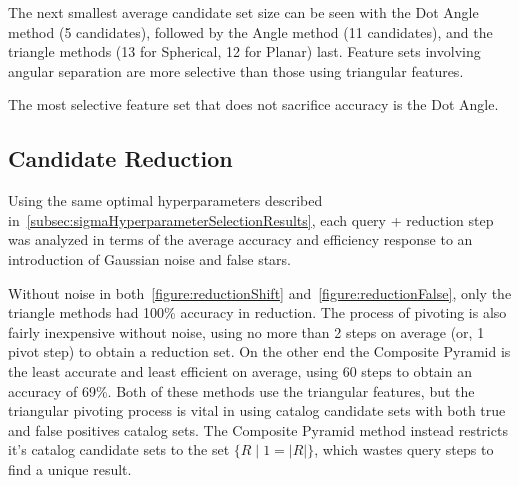 The next smallest average candidate set size can be seen with the Dot Angle method (5 candidates), followed by the
Angle method (11 candidates), and the triangle methods (13 for Spherical, 12 for Planar) last.
Feature sets involving angular separation are more selective than those using triangular features.

The most selective feature set that does not sacrifice accuracy is the Dot Angle.

\subsection{Candidate Reduction}\label{subsec:candidateReductionResults}
Using the same optimal hyperparameters described in~\autoref{subsec:sigmaHyperparameterSelectionResults}, each query +
reduction step was analyzed in terms of the average accuracy and efficiency response to an introduction of Gaussian
noise and false stars.

\begin{figure}
\end{figure}

Without noise in both~\autoref{figure:reductionShift} and~\autoref{figure:reductionFalse}, only the triangle methods
had 100\% accuracy in reduction.
The process of pivoting is also fairly inexpensive without noise, using no more than 2 steps on average
(or, 1 pivot step) to obtain a reduction set.
On the other end the Composite Pyramid is the least accurate and least efficient on average, using 60 steps to
obtain an accuracy of 69\%.
Both of these methods use the triangular features, but the triangular pivoting process is vital in using catalog
candidate sets with both true and false positives catalog sets.
The Composite Pyramid method instead restricts it's catalog candidate sets to the set $\{R \mid 1 = |R| \}$, which
wastes query steps to find a unique result.

